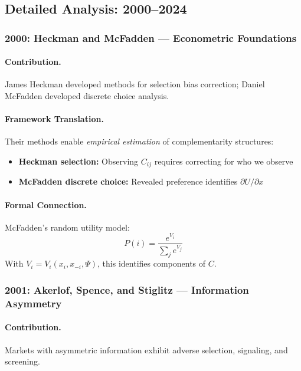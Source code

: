 \documentclass[12pt,a4paper]{article}
\begin{document}
\subsection{Detailed Analysis: 2000--2024}

\subsubsection{2000: Heckman and McFadden --- Econometric Foundations}

\paragraph{Contribution.}
James Heckman developed methods for selection bias correction;
Daniel McFadden developed discrete choice analysis.

\paragraph{Framework Translation.}
Their methods enable \emph{empirical estimation} of complementarity structures:
\begin{itemize}
  \item \textbf{Heckman selection:} Observing $C_{ij}$ requires correcting for who we observe
  \item \textbf{McFadden discrete choice:} Revealed preference identifies $\partial U / \partial x$
\end{itemize}

\paragraph{Formal Connection.}
McFadden's random utility model:
\begin{equation}
  P(i) = \frac{e^{V_i}}{\sum_j e^{V_j}}
\end{equation}
With $V_i = V_i(x_i, x_{-i}, \Psi)$, this identifies components of $C$.

\subsubsection{2001: Akerlof, Spence, and Stiglitz --- Information Asymmetry}

\paragraph{Contribution.}
Markets with asymmetric information exhibit adverse selection, signaling, and screening.
\end{document}

